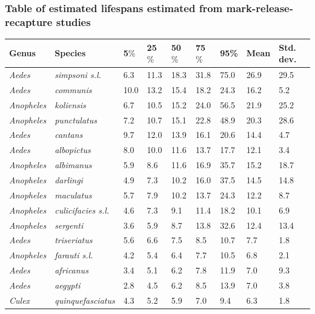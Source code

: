 \documentclass[12pt]{article}
\begin{document}
{\subsubsection{Table of estimated lifespans estimated from mark-release-recapture studies}

\begin{table}[htbp]
\begin{tabular}{l|l|l|l|l|l|l|l|l}
	\textbf{Genus} & \textbf{Species} & \textbf{5$\%$} & \textbf{25$\%$} & \textbf{50$\%$} & \textbf{75$\%$} & \textbf{95\%} &  \textbf{Mean} & \textbf{Std. dev.}\\
		\hline
 \textit{Aedes} & \textit{simpsoni s.l.} & 6.3 & 11.3 & 18.3 & 31.8 & 75.0 & 26.9 & 29.5 \\
\textit{Aedes} & \textit{communis} & 10.0 & 13.2 & 15.4 & 18.2 & 24.3 & 16.2 & 5.2 \\
\textit{Anopheles} & \textit{koliensis} & 6.7 & 10.5 & 15.2 & 24.0 & 56.5 & 21.9 & 25.2 \\
\textit{Anopheles} & \textit{punctulatus} & 7.2 & 10.7 & 15.1 & 22.8 & 48.9 & 20.3 & 28.6 \\
\textit{Aedes} & \textit{cantans} & 9.7 & 12.0 & 13.9 & 16.1 & 20.6 & 14.4 & 4.7 \\
\textit{Aedes} & \textit{albopictus} & 8.0 & 10.0 & 11.6 & 13.7 & 17.7 & 12.1 & 3.4 \\
\textit{Anopheles} & \textit{albimanus} & 5.9 & 8.6 & 11.6 & 16.9 & 35.7 & 15.2 & 18.7 \\
\textit{Anopheles} & \textit{darlingi} & 4.9 & 7.3 & 10.2 & 16.0 & 37.5 & 14.5 & 14.8 \\
\textit{Anopheles} & \textit{maculatus} & 5.7 & 7.9 & 10.2 & 13.7 & 24.3 & 12.2 & 8.7 \\
\textit{Anopheles} & \textit{culicifacies s.l.} & 4.6 & 7.3 & 9.1 & 11.4 & 18.2 & 10.1 & 6.9 \\
\textit{Anopheles} & \textit{sergenti} & 3.6 & 5.9 & 8.7 & 13.8 & 32.6 & 12.4 & 13.4 \\
\textit{Aedes} & \textit{triseriatus} & 5.6 & 6.6 & 7.5 & 8.5 & 10.7 & 7.7 & 1.8 \\
\textit{Anopheles} & \textit{farauti s.l.} & 4.2 & 5.4 & 6.4 & 7.7 & 10.5 & 6.8 & 2.1 \\
\textit{Aedes} & \textit{africanus} & 3.4 & 5.1 & 6.2 & 7.8 & 11.9 & 7.0 & 9.3 \\
\textit{Aedes} & \textit{aegypti} & 2.8 & 4.5 & 6.2 & 8.5 & 13.9 & 7.0 & 3.8 \\
\textit{Culex} & \textit{quinquefasciatus} & 4.3 & 5.2 & 5.9 & 7.0 & 9.4 & 6.3 & 1.8 \\

\end{tabular}
\end{table}}
\end{document}
